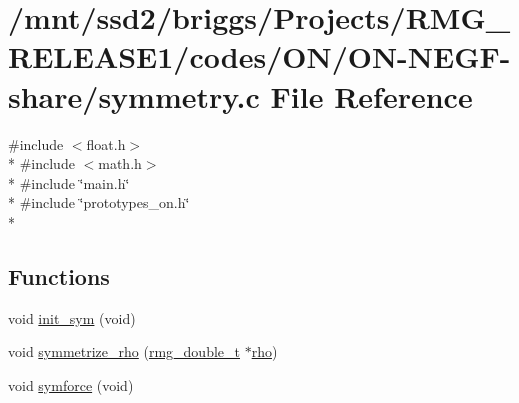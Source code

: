 \hypertarget{_o_n_2_o_n-_n_e_g_f-share_2symmetry_8c}{\section{/mnt/ssd2/briggs/\-Projects/\-R\-M\-G\-\_\-\-R\-E\-L\-E\-A\-S\-E1/codes/\-O\-N/\-O\-N-\/\-N\-E\-G\-F-\/share/symmetry.c File Reference}
\label{_o_n_2_o_n-_n_e_g_f-share_2symmetry_8c}
}
{\ttfamily \#include $<$float.\-h$>$}\\*
{\ttfamily \#include $<$math.\-h$>$}\\*
{\ttfamily \#include \char`\"{}main.\-h\char`\"{}}\\*
{\ttfamily \#include \char`\"{}prototypes\-\_\-on.\-h\char`\"{}}\\*
\subsection*{Functions}
\begin{DoxyCompactItemize}
\item 
void \hyperlink{_o_n_2_o_n-_n_e_g_f-share_2symmetry_8c_a3c6e919adb4ada8e5948b43afd73f9da}{init\-\_\-sym} (void)
\item 
void \hyperlink{_o_n_2_o_n-_n_e_g_f-share_2symmetry_8c_a09a0d9456b518687ed29eb13b0919c16}{symmetrize\-\_\-rho} (\hyperlink{rmgtypes_8h_aaa16921c14f121c56eaa42390a340db8}{rmg\-\_\-double\-\_\-t} $\ast$\hyperlink{md_8h_a52b35cee8a5db846ce98f4904e1c8b13}{rho})
\item 
void \hyperlink{_o_n_2_o_n-_n_e_g_f-share_2symmetry_8c_a705a332ea96bf7af5cee048566e67d1f}{symforce} (void)
\end{DoxyCompactItemize}


